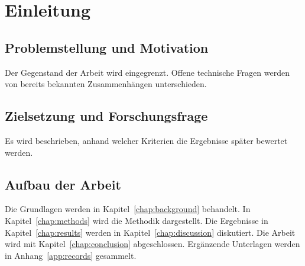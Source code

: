 \chapter{Einleitung}
\label{chap:introduction}

\section{Problemstellung und Motivation}
Der Gegenstand der Arbeit wird eingegrenzt. Offene technische Fragen
werden von bereits bekannten Zusammenhängen unterschieden.

\section{Zielsetzung und Forschungsfrage}
Es wird beschrieben, anhand welcher Kriterien die Ergebnisse später
bewertet werden.

\section{Aufbau der Arbeit}
Die Grundlagen werden in Kapitel~\ref{chap:background} behandelt.
In Kapitel~\ref{chap:methods} wird die Methodik dargestellt.
Die Ergebnisse in Kapitel~\ref{chap:results} werden in
Kapitel~\ref{chap:discussion} diskutiert. Die Arbeit wird mit
Kapitel~\ref{chap:conclusion} abgeschlossen. Ergänzende Unterlagen werden
in Anhang~\ref{app:records} gesammelt.
